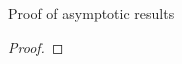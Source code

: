 \documentclass[fleqn,11pt,letterpaper]{article}
\theoremstyle{plain}
\theoremstyle{definition}
\theoremstyle{remark}
\numberwithin{equation}{section}
\begin{document}
\begin{section}{Proof of asymptotic results}
\begin{proof}
    
\end{proof}

\end{section}
\end{document}
